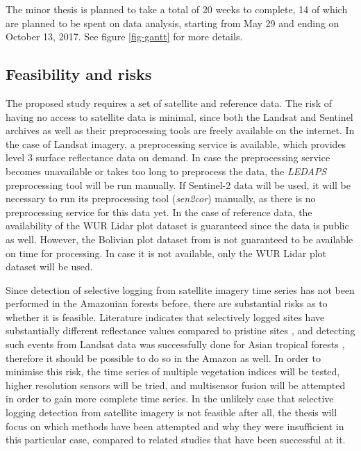 \documentclass[a4paper,10pt]{article}
\begin{document}
The minor thesis is planned to take a total of 20 weeks to complete, 14 of which are planned to be spent on data analysis, starting from May 29 and ending on October 13, 2017. See figure \ref{fig-gantt} for more details.

\subsection{Feasibility and risks}

The proposed study requires a set of satellite and reference data. The risk of having no access to satellite data is minimal, since both the Landsat and Sentinel archives as well as their preprocessing tools are freely available on the internet. In the case of Landsat imagery, a preprocessing service is available, which provides level 3 surface reflectance data on demand. In case the preprocessing service becomes unavailable or takes too long to preprocess the data, the \textit{LEDAPS} preprocessing tool will be run manually. If Sentinel-2 data will be used, it will be necessary to run its preprocessing tool (\textit{sen2cor}) manually, as there is no preprocessing service for this data yet. In the case of reference data, the availability of the \ac{WUR} Lidar plot dataset is guaranteed since the data is public as well. However, the Bolivian plot dataset from \citet{broadbent_recovery_2006} is not guaranteed to be available on time for processing. In case it is not available, only the \ac{WUR} Lidar plot dataset will be used.

Since detection of selective logging from satellite imagery time series has not been performed in the Amazonian forests before, there are substantial risks as to whether it is feasible. Literature indicates that selectively logged sites have substantially different reflectance values compared to pristine sites \citep{broadbent_recovery_2006}, and detecting such events from Landsat data was successfully done for Asian tropical forests \citep{shimizu_using_2017}, therefore it should be possible to do so in the Amazon as well. In order to minimise this risk, the time series of multiple vegetation indices will be tested, higher resolution sensors will be tried, and multisensor fusion will be attempted in order to gain more complete time series. In the unlikely case that selective logging detection from satellite imagery is not feasible after all, the thesis will focus on which methods have been attempted and why they were insufficient in this particular case, compared to related studies that have been successful at it.
\end{document}
